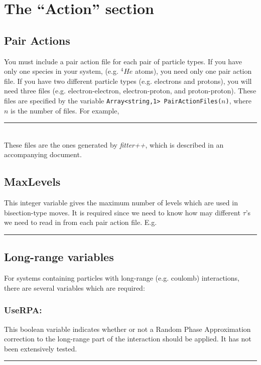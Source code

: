 \documentclass{book}
\begin{document}
\section{The ``Action'' section}
\subsection{Pair Actions}
You must include a pair action file for each pair of particle types.
If you have only one species in your system, (e.g. $^4He$ atoms), you
need only one pair action file.  If you have two different particle types
(e.g. electrons and protons), you will need three files
(e.g. electron-electron, electron-proton, and proton-proton).  These
files are specified by the variable \texttt{Array<string,1>
  PairActionFiles($n$)}, where $n$ is the number of files.  For
example, \\ 
\rule{0.6cm}{0cm}\\
These files are the ones generated by {\em fitter++}, which is
described in an accompanying document.
\subsection{MaxLevels}
This integer variable gives the maximum number of levels which are
used in bisection-type moves.  It is required since we need to know
how may different $\tau$'s we need to read in from each pair action
file.  E.g.\\
\rule{0.6cm}{0cm}
\subsection{Long-range variables}
For systems containing particles with long-range (e.g. coulomb)
interactions, there are several variables which are required:
\subsubsection{UseRPA:}
   This boolean variable indicates whether or not a Random Phase
 Approximation correction to the long-range part of the interaction
 should be applied.  It has not been extensively tested.\\
\rule{0.6cm}{0cm}\\
\end{document}
